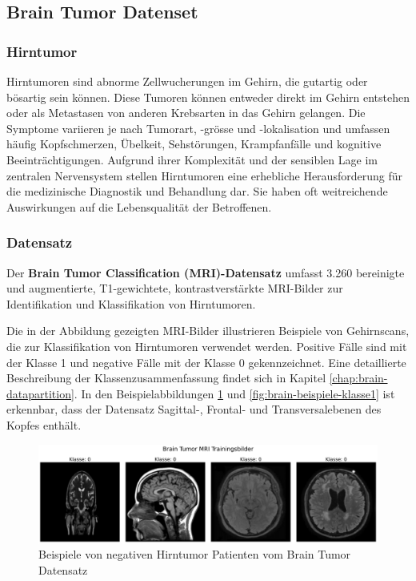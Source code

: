 \subsection{Brain Tumor Datenset} \label{chap:Brain-Tumor}
\subsubsection{Hirntumor} \label{chap:Hirntumor}
Hirntumoren sind abnorme Zellwucherungen im Gehirn, die gutartig oder bösartig sein können. Diese Tumoren können entweder direkt im Gehirn entstehen oder als Metastasen von anderen Krebsarten in das Gehirn gelangen. Die Symptome variieren je nach Tumorart, -grösse und -lokalisation und umfassen häufig Kopfschmerzen, Übelkeit, Sehstörungen, Krampfanfälle und kognitive Beeinträchtigungen. Aufgrund ihrer Komplexität und der sensiblen Lage im zentralen Nervensystem stellen Hirntumoren eine erhebliche Herausforderung für die medizinische Diagnostik und Behandlung dar. Sie haben oft weitreichende Auswirkungen auf die Lebensqualität der Betroffenen.

\subsubsection{Datensatz} \label{chap:brain-datensatz}
Der \textbf{Brain Tumor Classification (MRI)-Datensatz} \cite{bhuvaji_brain_2020} umfasst 3.260 bereinigte und augmentierte, T1-gewichtete, kontrastverstärkte MRI-Bilder zur Identifikation und Klassifikation von Hirntumoren.

Die in der Abbildung gezeigten MRI-Bilder illustrieren Beispiele von Gehirnscans, die zur Klassifikation von Hirntumoren verwendet werden. Positive Fälle sind mit der Klasse 1 und negative Fälle mit der Klasse 0 gekennzeichnet. Eine detaillierte Beschreibung der Klassenzusammenfassung findet sich in Kapitel \ref{chap:brain-datapartition}. In den Beispielabbildungen \ref{fig:brain-beispiele-klasse0} und \ref{fig:brain-beispiele-klasse1} ist erkennbar, dass der Datensatz Sagittal-, Frontal- und Transversalebenen des Kopfes enthält.

\begin{figure}[H]
    \centering
    \includegraphics[width=\linewidth]{01-images/03-data/brain-klasse0.png}
    \caption{Beispiele von negativen Hirntumor Patienten vom Brain Tumor Datensatz}
    \label{fig:brain-beispiele-klasse0}
\end{figure}

